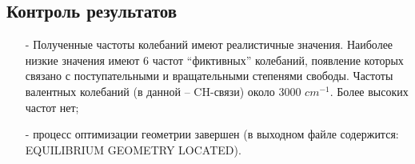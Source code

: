 \subsection{Контроль результатов}
\begin{itemize}
    \item[-] Полученные частоты колебаний имеют реалистичные значения. Наиболее низкие значения имеют 6 частот “фиктивных” колебаний, появление которых связано с поступательными и вращательными степенями свободы. Частоты валентных колебаний (в данной -- CH-связи) около 3000 $cm^{-1}$. Более высоких частот нет;
    \item[-] процесс оптимизации геометрии завершен (в выходном файле содержится: EQUILIBRIUM GEOMETRY LOCATED). 
\end{itemize}{}